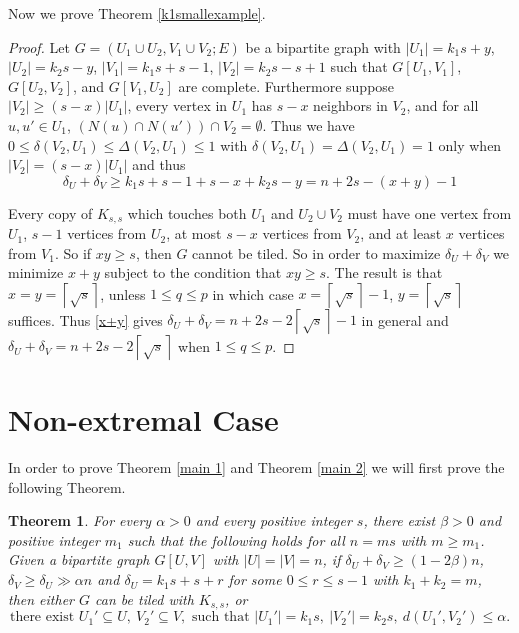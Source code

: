 \documentclass[oneside,12pt]{memoir}
\newtheorem{theorem}{Theorem}[section]
\newcommand{\croot}[1]{\left\lceil\sqrt{#1}\right\rceil}
\begin{document}
Now we prove Theorem \ref{k1smallexample}.

\begin{proof}



Let $G=(U_1\cup U_2, V_1\cup V_2; E)$ be a bipartite graph with $|U_1|=k_1s+y$, $|U_2|=k_2s-y$, $|V_1|=k_1s+s-1$, $|V_2|=k_2s-s+1$ such that $G[U_1,V_1]$, $G[U_2,V_2]$, and $G[V_1,U_2]$ are complete.  Furthermore suppose $|V_2|\geq (s-x)|U_1|$, every vertex in $U_1$ has $s-x$ neighbors in $V_2$, and for all $u, u'\in U_1$, $(N(u)\cap N(u'))\cap V_2=\emptyset$.  Thus we have $0\leq \delta(V_2,U_1)\leq\Delta(V_2,U_1)\leq 1$ with $\delta(V_2, U_1)=\Delta(V_2, U_1)=1$ only when $|V_2|=(s-x)|U_1|$ and thus
\begin{equation}
\delta_U+\delta_V\geq k_1s+s-1+s-x+k_2s-y=n+2s-(x+y)-1 \label{x+y}
\end{equation}

Every copy of $K_{s,s}$ which touches both $U_1$ and $U_2\cup V_2$ must have one vertex from $U_1$, $s-1$ vertices from $U_2$, at most $s-x$ vertices from $V_2$, and at least $x$ vertices from $V_1$.  So if $xy\geq s$, then $G$ cannot be tiled.   So in order to maximize $\delta_U+\delta_V$ we minimize $x+y$ subject to the condition that $xy\geq s$.  The result is that $x=y=\croot{s}$, unless $1\leq q\leq p$ in which case $x=\croot{s}-1$, $y=\croot{s}$ suffices.  Thus \eqref{x+y} gives $\delta_U+\delta_V= n+2s-2\croot{s}-1$ in general and $\delta_U+\delta_V=n+2s-2\croot{s}$ when $1\leq q\leq p$.

\end{proof}






\section{Non-extremal Case}

In order to prove Theorem \ref{main 1} and Theorem \ref{main 2} we will first prove the following Theorem.  

\begin{theorem}\label{non-extreme}
For every $\alpha>0$ and every positive integer $s$, there exist $\beta>0$ and positive integer $m_1$ such that the following holds for all $n=ms$ with $m\geq m_1$.  Given a bipartite graph $G[U,V]$ with $|U|=|V|=n$, if $\delta_U+\delta_V\geq (1-2\beta)n$, $\delta_V\geq \delta_U\gg \alpha n$ and $\delta_U=k_1s+s+r$ for some $0\leq r\leq s-1$ with $k_1+k_2=m$, then either $G$ can be tiled with $K_{s,s}$, or 
\begin{equation}\label{extremalcondition-gen}
\text{there exist } U_1'\subseteq U,~ V_2'\subseteq V, \text{ such that } |U_1'|=k_1s,~ |V_2'|=k_2s,~ d(U_1',V_2')\leq \alpha.
\end{equation}
\end{theorem}
\end{document}
